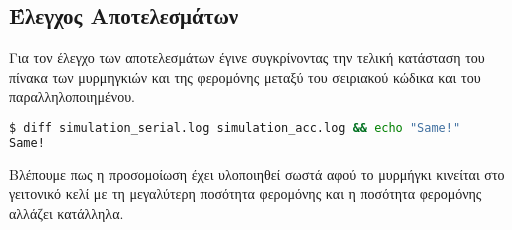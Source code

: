 \documentclass[11pt]{scrartcl} %
\begin{document}
\subsection{Έλεγχος Αποτελεσμάτων}

Για τον έλεγχο των αποτελεσμάτων έγινε συγκρίνοντας 
την τελική κατάσταση του πίνακα των μυρμηγκιών και της φερομόνης 
μεταξύ του σειριακού κώδικα και του παραλληλοποιημένου.

\begin{lstlisting}[language=Bash]
$ diff simulation_serial.log simulation_acc.log && echo "Same!"
Same!
\end{lstlisting}



Βλέπουμε πως η προσομοίωση έχει υλοποιηθεί σωστά αφού το μυρμήγκι κινείται στο γειτονικό κελί με τη μεγαλύτερη ποσότητα φερομόνης 
και η ποσότητα φερομόνης αλλάζει κατάλληλα.

% 
\end{document}

